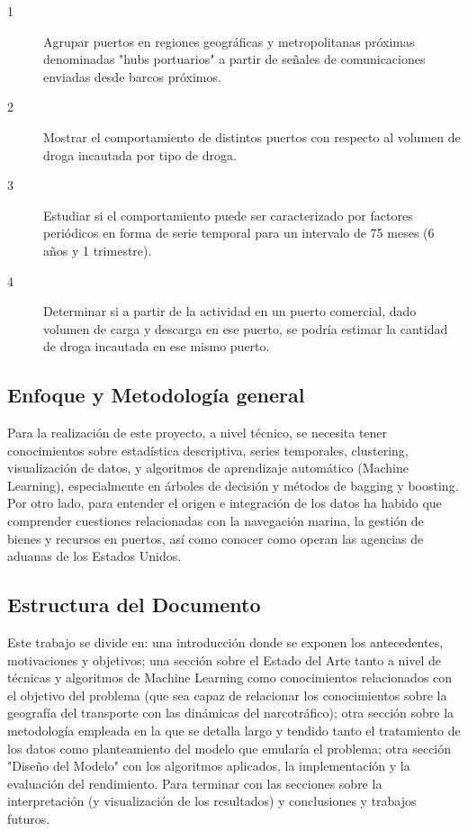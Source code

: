 \documentclass[12pt]{article}
\begin{document}
	\begin{description}
		\item[1] Agrupar puertos en regiones geográficas y metropolitanas próximas denominadas "hubs portuarios" a partir de señales de comunicaciones enviadas desde barcos próximos.
		\item[2] Mostrar el comportamiento de distintos puertos con respecto al volumen de droga incautada por tipo de droga.
		\item[3] Estudiar si el comportamiento puede ser caracterizado por factores periódicos en forma de serie temporal para un intervalo de 75 meses (6 años y 1 trimestre).
		\item[4] Determinar si a partir de la actividad en un puerto comercial, dado volumen de carga y descarga en ese puerto, se podría estimar la cantidad de droga incautada en ese mismo puerto.
	\end{description}

	\subsection{Enfoque y Metodología general}
	Para la realización de este proyecto, a nivel técnico, se necesita tener conocimientos sobre estadística descriptiva, series temporales, clustering, visualización de datos, y algoritmos de aprendizaje automático (Machine Learning), especialmente en árboles de decisión y métodos de bagging y boosting. Por otro lado, para entender el origen e integración de los datos ha habido que comprender cuestiones relacionadas con la navegación marina, la gestión de bienes y recursos en puertos, así como conocer como operan las agencias de aduanas de los Estados Unidos.

	\subsection{Estructura del Documento}
	Este trabajo se divide en: una introducción donde se exponen los antecedentes, motivaciones y objetivos; una sección sobre el Estado del Arte tanto a nivel de técnicas y algoritmos de Machine Learning como conocimientos relacionados con el objetivo del problema (que sea capaz de relacionar los conocimientos sobre la geografía del transporte con las dinámicas del narcotráfico); otra sección sobre la metodología empleada en la que se detalla largo y tendido tanto el tratamiento de los datos como planteamiento del modelo que emularía el problema; otra sección "Diseño del Modelo" con los algoritmos aplicados, la implementación y la evaluación del rendimiento. Para terminar con las secciones sobre la interpretación (y visualización de los resultados) y conclusiones y trabajos futuros.
\end{document}
